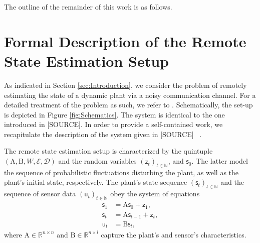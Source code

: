 \documentclass[conference]{IEEEtran}
\newcommand{\rs}{\mathsf{s}}
\newcommand{\rz}{\mathsf{z}}
\newcommand{\ru}{\mathsf{u}}
\def\E{{\mathcal E}}
\def\D{{\mathcal D}}
\def\NN{{\mathbb N}}
\def\RR{{\mathbb R}}
\def\mA{\bm{\mathrm{A}}}
\def\mB{\bm{\mathrm{B}}}
\newcommand{\sdummy}{{\color{red}[SOURCE]}}
\begin{document}

	The outline of the remainder of this work is as follows.

\section{Formal Description of the Remote State Estimation Setup}
	\noindent As indicated in Section \ref{sec:Introduction}, we consider the problem of remotely estimating the state of a dynamic plant via a noisy communication channel. 
	For a detailed treatment of the problem as such, we refer to \cite{MS07}. Schematically, the set-up is depicted in Figure \ref{fig:Schematics}. 
	The system is identical to the one introduced in \sdummy. In order to provide a self-contained work, we recapitulate the description of the 
	system given in \sdummy~ 
	.

	The remote state estimation setup is characterized by the quintuple \((\mA,\mB,W,\E,\D)\) and the random variables \((\rz_t)_{t\in\NN}\), and \(\rs_{0}\). 
	The latter model the sequence of probabilistic fluctuations disturbing the plant, as well as the plant's initial state, respectively. The plant's state sequence \((\rs_t)_{t\in\NN}\) 
	and the sequence of sensor data \((\ru_t)_{t\in\NN}\) obey the system of equations
	\begin{align}	\rs_1    &= \mA \rs_0 + \rz_1, \\ 
					\rs_t    &= \mA \rs_{t-1} + \rz_t,\\ 
					\ru_t    &= \mB \rs_t,
	\end{align}
	where \(\mA\in\RR^{n\times n}\) and \(\mB\in\RR^{n\times l}\) capture the plant's and sensor's characteristics. 
\end{document}

